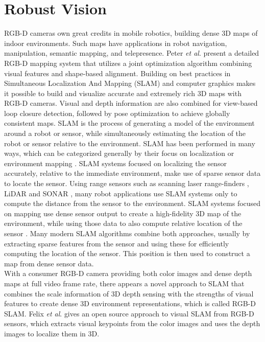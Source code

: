 \section{Robust Vision}
\indent
RGB-D cameras own great credits in mobile robotics, building dense 3D maps of indoor environments. Such maps have applications in robot navigation, manipulation, semantic mapping, and telepresence. Peter \textit{et al}. \cite{indorMappingRGBD_2014} present a detailed RGB-D mapping system that utilizes a joint optimization algorithm combining visual features and shape-based alignment. Building on best practices in Simultaneous Localization And Mapping (SLAM) and computer graphics makes it possible to build and visualize accurate and extremely rich 3D maps with RGB-D cameras. Visual and depth information are also combined for view-based loop closure detection, followed by pose optimization to achieve globally consistent maps. SLAM is the process of generating a model of the environment around a robot or sensor, while simultaneously estimating the location of the robot or sensor relative to the environment. SLAM has been performed in many ways, which can be categorized generally by their focus on localization or environment mapping \cite{SLAMintro_2015}. SLAM systems focused on localizing the sensor accurately, relative to the immediate environment, make use of sparse sensor data to locate the sensor. Using range sensors such as scanning laser range-finders \cite{laserSLAM_2011}, LiDAR and SONAR \cite{sonarSLAM_2013}, many robot applications use SLAM systems only to compute the distance from the sensor to the environment. SLAM systems focused on mapping use dense sensor output to create a high-fidelity 3D map of the environment, while using those data to also compute relative location of the sensor \cite{KinectFusion_2011, mapSLAM_2013}. Many modern SLAM algorithms combine both approaches, usually by extracting sparse features from the sensor and using these for efficiently computing the location of the sensor. This position is then used to construct a map from dense sensor data. 
\\\indent
With a consumer RGB-D camera providing both color images and dense depth maps at full video frame rate, there appears a novel approach to SLAM that combines the scale information of 3D depth sensing with the strengths of visual features to create dense 3D environment representations, which is called RGB-D SLAM. Felix \textit{et al}. \cite{RGBDSLAM01_2012} gives an open source approach to visual SLAM from RGB-D sensors, which extracts visual keypoints from the color images and uses the depth images to localize them in 3D. %
